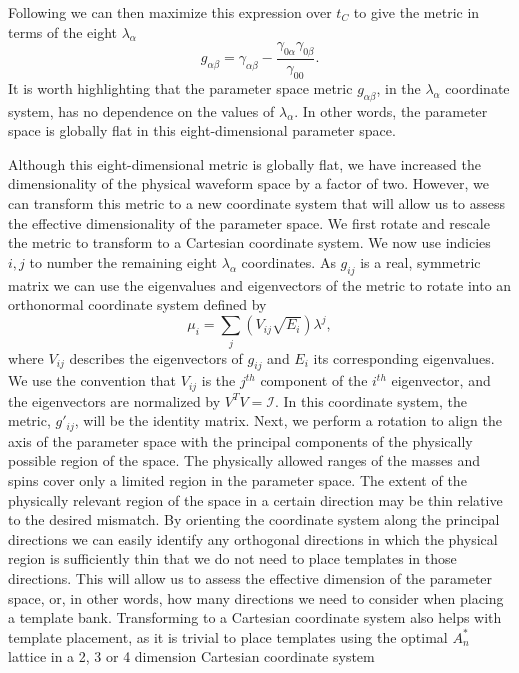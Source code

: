 Following \cite{Owen96} we can then maximize this expression over $t_C$ to give the metric in terms of the eight $\lambda_\alpha$ 
%
\begin{equation}
 g_{\alpha \beta} = \gamma_{\alpha \beta} - \frac{\gamma_{0 \alpha} \gamma_{0 \beta}}{\gamma_{0 0}}.
\end{equation}
%
It is worth highlighting that the parameter space
metric $g_{\alpha \beta}$, in the $\lambda_\alpha$ coordinate system, has no dependence
on the values of $\lambda_\alpha$. In other
words, the parameter space is globally flat in this eight-dimensional
parameter space.

Although this eight-dimensional metric is globally flat, we have increased the
dimensionality of the physical waveform space by a factor of two.  However, we
can transform this metric to a new coordinate system that will allow us to
assess the effective dimensionality of the parameter space.%
We first rotate and rescale the metric to transform to a Cartesian
coordinate system. We now use indicies $i, j$ to number the remaining eight $\lambda_\alpha$ coordinates. As $g_{ij}$ is a real, symmetric matrix we can use the
eigenvalues and eigenvectors of the metric to rotate into an orthonormal
coordinate system defined by
%
\begin{equation}
 \mu_i = \sum_{j} \left(V_{ij} \sqrt{E_i} \right) \lambda^{j},
\end{equation}
%
where $V_{ij}$ describes the eigenvectors of $g_{ij}$ and $E_{i}$ its
corresponding eigenvalues. 
We use the convention that $V_{ij}$ is the $j^{th}$ component of the $i^{th}$
eigenvector, and the eigenvectors are normalized by $V^T V = \mathcal{I}$. 
In this coordinate system, the metric, $g'_{ij}$,
will be the identity matrix. Next, we perform a rotation to align the axis of
the parameter space with the principal components of the physically possible
region of the space. The physically allowed ranges of the masses and spins
cover only a limited region in the parameter space.  The extent of the
physically relevant region of the space in a certain direction may be thin
relative to the desired mismatch. By orienting the coordinate system along the
principal directions we can easily identify any orthogonal directions in which
the physical region is sufficiently thin that we do not need to place
templates in those directions. This will allow us to assess the effective
dimension of the parameter space, or, in other words, how many directions we
need to consider when placing a template bank. Transforming to a Cartesian
coordinate system also helps with template placement, as it is trivial to
place templates using the optimal $A_n^*$ lattice \cite{Conway:1993} in a 2, 3
or 4 dimension Cartesian coordinate system

